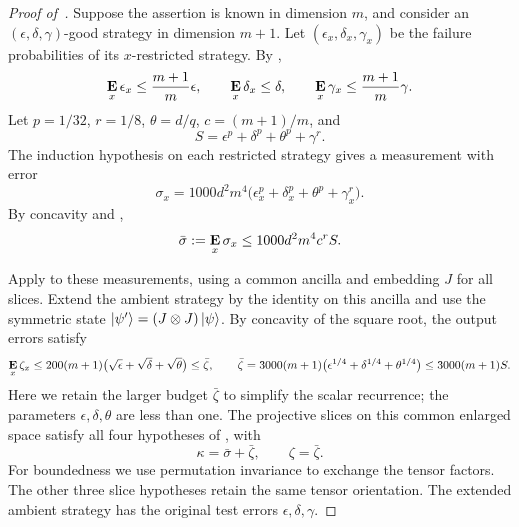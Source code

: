 \documentclass[11pt]{article}
\theoremstyle{definition}
\newcommand{\E}{\mathop{\bf E\/}}
\newcommand{\eps}{\epsilon}
\begin{document}
\begin{proof}[Proof of~]
Suppose the assertion is known in dimension $m$, and consider an
$(\eps,\delta,\gamma)$-good strategy in dimension $m+1$.  Let
$(\eps_x,\delta_x,\gamma_x)$ be the failure probabilities of its
$x$-restricted strategy.  By ,
\[
 \E_x\eps_x\leq\frac{m+1}{m}\eps,
 \qquad \E_x\delta_x\leq\delta,
 \qquad \E_x\gamma_x\leq\frac{m+1}{m}\gamma.
\]
Let $p=1/32$, $r=1/8$, $\theta=d/q$, $c=(m+1)/m$, and
\[
 S=\eps^p+\delta^p+\theta^p+\gamma^r.
\]
The induction hypothesis on each restricted strategy gives a
measurement with error
\[
 \sigma_x=1000d^2m^4
 \bigl(\eps_x^p+\delta_x^p+\theta^p+\gamma_x^r\bigr).
\]
By concavity and ,
\begin{equation}\label{eq:average-induction-error}
 \bar\sigma:=\E_x\sigma_x
 \leq1000d^2m^4c^rS.
\end{equation}

Apply  to these
measurements, using a common ancilla and embedding $J$ for all
slices.  Extend the ambient strategy by the identity on this ancilla
and use the symmetric state $\ket{\psi'}=(J\otimes J)\ket\psi$.
By concavity of the square root, the output errors satisfy
\[
 \E_x\zeta_x
 \leq200(m+1)\bigl(\sqrt\eps+\sqrt\delta+\sqrt\theta\bigr)
 \leq\bar\zeta,
 \qquad
 \bar\zeta=3000(m+1)
 \bigl(\eps^{1/4}+\delta^{1/4}+\theta^{1/4}\bigr)
 \leq3000(m+1)S.
\]
Here we retain the larger budget $\bar\zeta$ to simplify the scalar
recurrence; the parameters $\eps,\delta,\theta$ are less than one.
The projective slices on this common enlarged space satisfy all four
hypotheses of , with
\[
 \kappa=\bar\sigma+\bar\zeta,\qquad\zeta=\bar\zeta.
\]
For boundedness we use permutation invariance to exchange the tensor
factors.  The other three slice hypotheses retain the same tensor
orientation.  The extended ambient strategy has the original test
errors $\eps,\delta,\gamma$.


\end{proof}
\end{document}
